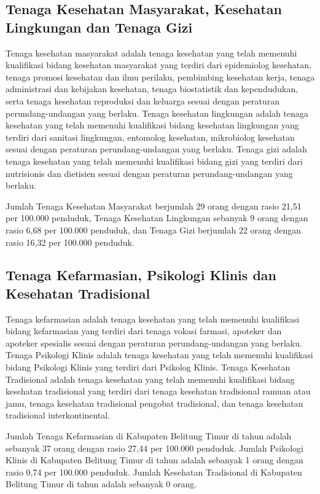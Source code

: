 \subsection{Tenaga Kesehatan Masyarakat, Kesehatan Lingkungan dan Tenaga Gizi}
Tenaga kesehatan masyarakat adalah tenaga kesehatan yang telah memenuhi kualifikasi bidang kesehatan masyarakat
yang terdiri dari epidemiolog kesehatan, tenaga promosi kesehatan dan ilmu perilaku, pembimbing kesehatan kerja,
tenaga administrasi dan kebijakan kesehatan, tenaga biostatistik dan kependudukan, serta tenaga kesehatan reproduksi
dan keluarga sesuai dengan peraturan perundang-undangan yang berlaku.
Tenaga kesehatan lingkungan adalah tenaga kesehatan yang telah memenuhi kualifikasi bidang kesehatan lingkungan yang terdiri dari sanitasi lingkungan,
entomolog kesehatan, mikrobiolog kesehatan sesuai dengan peraturan perundang-undangan yang berlaku.
Tenaga gizi adalah tenaga kesehatan yang telah memenuhi kualifikasi bidang gizi yang terdiri dari nutrisionis dan dietisien
sesuai dengan peraturan perundang-undangan yang berlaku.

Jumlah Tenaga Kesehatan Masyarakat berjumlah 29 orang dengan rasio 21,51 per 100.000 penduduk, Tenaga Kesehatan Lingkungan sebanyak 9 orang dengan rasio 6,68 per 100.000 penduduk, dan Tenaga Gizi berjumlah 22 orang dengan rasio 16,32 per 100.000 penduduk.

\subsection{Tenaga Kefarmasian, Psikologi Klinis dan Kesehatan Tradisional}
Tenaga kefarmasian adalah tenaga kesehatan yang telah memenuhi kualifikasi bidang kefarmasian yang terdiri dari tenaga vokasi farmasi, apoteker dan apoteker spesialis sesuai dengan peraturan perundang-undangan yang berlaku. Tenaga Psikologi Klinis adalah tenaga kesehatan yang telah memenuhi kualifikasi bidang Psikologi Klinis yang terdiri dari Psikolog Klinis. Tenaga Kesehatan Tradisional adalah tenaga kesehatan yang telah memenuhi kualifikasi bidang kesehatan tradisional yang terdiri dari tenaga kesehatan tradisional ramuan atau jamu, tenaga kesehatan tradisional pengobat tradisional, dan tenaga kesehatan tradisional interkontinental.

Jumlah Tenaga Kefarmasian di Kabupaten Belitung Timur di tahun \tP adalah sebanyak 37 orang dengan rasio 27,44 per 100.000 penduduk.
Jumlah Psikologi Klinis di Kabupaten Belitung Timur di tahun \tP adalah sebanyak 1 orang dengan rasio 0,74 per 100.000 penduduk.
Jumlah Kesehatan Tradisional di Kabupaten Belitung Timur di tahun \tP adalah sebanyak 0 orang.

